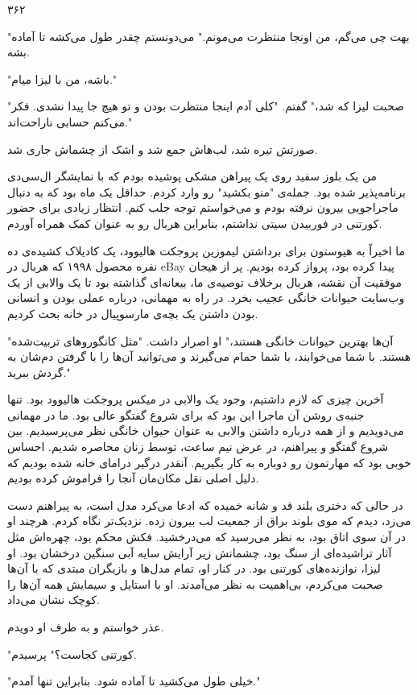 ۳۶۲

"بهت چی می‌گم، من اونجا منتظرت می‌مونم." می‌دونستم چقدر طول می‌کشه تا آماده بشه.

"باشه، من با لیزا میام."

"صحبت لیزا که شد،" گفتم. "کلی آدم اینجا منتظرت بودن و تو هیچ جا پیدا نشدی. فکر می‌کنم حسابی ناراحت‌اند."

صورتش تیره شد، لب‌هاش جمع شد و اشک از چشماش جاری شد.

من یک بلوز سفید روی یک پیراهن مشکی پوشیده بودم که با نمایشگر ال‌سی‌دی برنامه‌پذیر شده بود. جمله‌ی "منو بکشید" رو وارد کردم. حداقل یک ماه بود که به دنبال ماجراجویی بیرون نرفته بودم و می‌خواستم توجه جلب کنم. انتظار زیادی برای حضور کورتنی در فوربیدن سیتی نداشتم، بنابراین هربال رو به عنوان کمک همراه آوردم.

ما اخیراً به هیوستون برای برداشتن لیموزین پروجکت هالیوود، یک کادیلاک کشیده‌ی ده نفره محصول ۱۹۹۸ که هربال در eBay پیدا کرده بود، پرواز کرده بودیم. پر از هیجان موفقیت آن نقشه، هربال برخلاف توصیه‌ی ما، بیعانه‌ای گذاشته بود تا یک والابی از یک وب‌سایت حیوانات خانگی عجیب بخرد. در راه به مهمانی، درباره عملی بودن و انسانی بودن داشتن یک بچه‌ی مارسوپیال در خانه بحث کردیم.

"آن‌ها بهترین حیوانات خانگی هستند،" او اصرار داشت. "مثل کانگوروهای تربیت‌شده هستند. با شما می‌خوابند، با شما حمام می‌گیرند و می‌توانید آن‌ها را با گرفتن دم‌شان به گردش ببرید."

آخرین چیزی که لازم داشتیم، وجود یک والابی در میکس پروجکت هالیوود بود. تنها جنبه‌ی روشن آن ماجرا این بود که برای شروع گفتگو عالی بود. ما در مهمانی می‌دویدیم و از همه درباره داشتن والابی به عنوان حیوان خانگی نظر می‌پرسیدیم. بین شروع گفتگو و پیراهنم، در عرض نیم ساعت، توسط زنان محاصره شدیم. احساس خوبی بود که مهارتمون رو دوباره به کار بگیریم. آنقدر درگیر درامای خانه شده بودیم که دلیل اصلی نقل مکان‌مان آنجا را فراموش کرده بودیم.

در حالی که دختری بلند قد و شانه خمیده که ادعا می‌کرد مدل است، به پیراهنم دست می‌زد، دیدم که موی بلوند براق از جمعیت لب بیرون زده. نزدیک‌تر نگاه کردم. هرچند او در آن سوی اتاق بود، به نظر می‌رسید که می‌درخشید. فکش محکم بود، چهره‌اش مثل آثار تراشیده‌ای از سنگ بود، چشمانش زیر آرایش سایه آبی سنگین درخشان بود. او لیزا، نوازنده‌های کورتنی بود. در کنار او، تمام مدل‌ها و بازیگران مبتدی که با آن‌ها صحبت می‌کردم، بی‌اهمیت به نظر می‌آمدند. او با استایل و سیمایش همه آن‌ها را کوچک نشان می‌داد.

عذر خواستم و به طرف او دویدم.

"کورتنی کجاست؟" پرسیدم.

"خیلی طول می‌کشید تا آماده شود. بنابراین تنها آمدم."